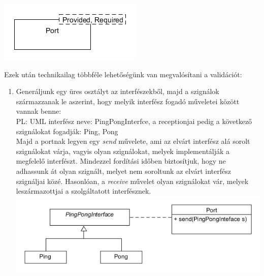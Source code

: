 \documentclass[a4paper,12pt]{report}
\begin{document}
\includegraphics[scale=0.7]{port_class.png}


Ezek után technikailag többféle lehetőségünk van megvalósítani a validációt: \\
\begin{enumerate}

\item Generáljunk egy üres osztályt az interfészekből, majd a szignálok származzanak le aszerint, hogy melyik interfész fogadó műveletei között vannak benne: \\
PL: UML interfész neve: PingPongInterfce, a receptionjai pedig a következő szignálokat fogadják: Ping, Pong \\
Majd a portnak legyen egy \textit{send} művelete, ami az elvárt interfész alá sorolt szignálokat várja, vagyis olyan szignálokat, melyek implementálják a megfelelő interfészt.
Mindezzel fordítási időben biztosítjuk, hogy ne adhassunk át olyan szignált, melyet nem soroltunk az elvárt interfész szignáljai közé. Hasonlóan, a \textit{receive} művelet olyan szignálokat vár, melyek leszármazottjai a szolgáltatott interfésznek. \\

\includegraphics[scale=0.7]{inf_ver1.png} \\


\end{enumerate}
\end{document}
